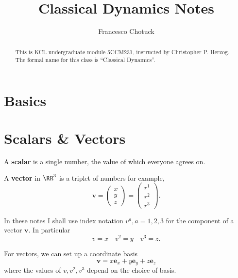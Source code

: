 \documentclass[12pt, a4paper]{article}
\title{Classical Dynamics Notes}
\date{}
\author{Francesco Chotuck}
\begin{document}
\maketitle

\begin{abstract}
    This is KCL undergraduate module 5CCM231, instructed by Christopher P. Herzog. The formal name for this class is ``Classical Dynamics''.
\end{abstract}

\tableofcontents

\pagebreak


\section*{Basics}

\section{Scalars \& Vectors}

\begin{definition}
    A \textbf{scalar} is a single number, the value of which everyone agrees on.
\end{definition}

\begin{definition}
    A \textbf{vector} in \(\RR^3\) is a triplet of numbers for example, 
    \[\bm{v} = \begin{pmatrix} x \\ y \\ z\end{pmatrix} = \begin{pmatrix} r^1 \\ r^2 \\ r^3 \end{pmatrix}.\]
\end{definition}

\begin{mdnote}
In these notes I shall use index notation \(v^a, a=1,2,3\) for the component of a vector \(\bm{v}\). In particular 
\[v=x \quad v^2=y \quad v^3=z.\]
\end{mdnote}

\begin{theorem}
    For vectors, we can set up a coordinate basis 
    \[\bm{v} = x\bm{e}_x+y\bm{e}_y+z\bm{e}_z\]
    where the values of \(v,v^2,v^3\) depend on the choice of basis.
\end{theorem}
\end{document}

